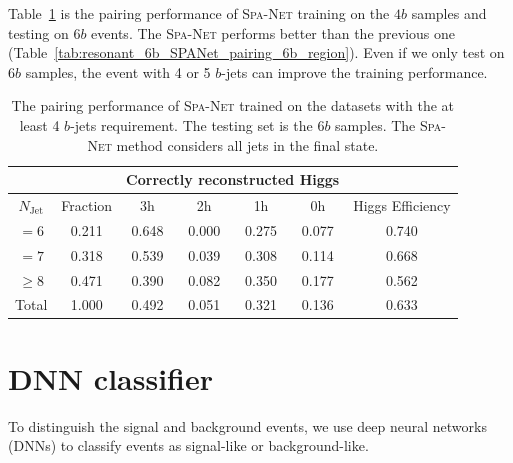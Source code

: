 \documentclass[12pt]{article}
\begin{document}
    Table~\ref{tab:resonant_4b_SPANet_pairing_6b_region} is the pairing performance of \textsc{Spa-Net} training on the $4b$ samples and testing on $6b$ events. The \textsc{Spa-Net} performs better than the previous one (Table~\ref{tab:resonant_6b_SPANet_pairing_6b_region}). Even if we only test on $6b$ samples, the event with 4 or 5 $b$-jets can improve the training performance.
    \begin{table}[htpb]
		\centering
        \caption{The pairing performance of \textsc{Spa-Net} trained on the datasets with the at least 4 $b$-jets requirement. The testing set is the $6b$ samples. The \textsc{Spa-Net} method considers all jets in the final state.}
		\label{tab:resonant_4b_SPANet_pairing_6b_region}
		\begin{tabular}{c|c|cccc|c}
			\multicolumn{1}{l|}{} &          & \multicolumn{4}{c|}{Correctly reconstructed Higgs} & \multicolumn{1}{l}{} \\ \hline
			$N_\text{Jet}$        & Fraction & 3h          & 2h         & 1h         & 0h         & Higgs Efficiency     \\ \hline
			$=6$                  & 0.211 & 0.648 & 0.000 & 0.275 & 0.077 & 0.740 \\
			$=7$                  & 0.318 & 0.539 & 0.039 & 0.308 & 0.114 & 0.668 \\
			$\ge 8$               & 0.471 & 0.390 & 0.082 & 0.350 & 0.177 & 0.562 \\ \hline
			Total                 & 1.000 & 0.492 & 0.051 & 0.321 & 0.136 & 0.633
		\end{tabular}
	\end{table}
\section{DNN classifier}%
\label{sec:dnn_classifier}
    To distinguish the signal and background events, we use deep neural networks (DNNs) to classify events as signal-like or background-like.
\end{document}
